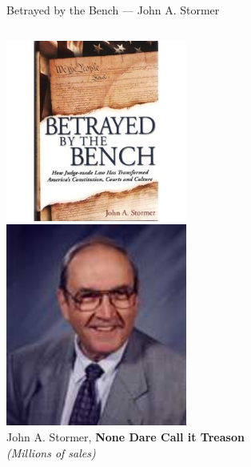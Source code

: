 \begin{frame}{Betrayed by the Bench --- John A. Stormer}
    \begin{columns}[onlytextwidth]
            \centering
            \includegraphics[width=0.75\textwidth]{img/betrayed-by-the-bench.png} \\

            \centering
            \includegraphics[width=0.75\textwidth]{img/john-stormer.png} \\
            John A. Stormer, \textbf{None Dare Call it Treason} \\
            \emph{(Millions of sales)} \\
    \end{columns}
\end{frame}

